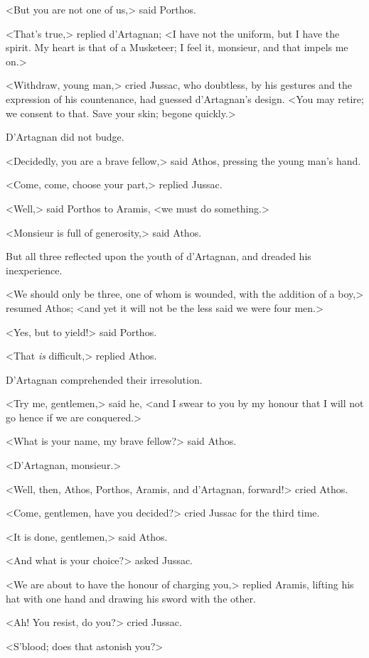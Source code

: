 <But you are not one of us,> said Porthos. 

<That's true,> replied d'Artagnan; <I have not the uniform, but I have the spirit. My heart is that of a Musketeer; I feel it, monsieur, and that impels me on.> 

<Withdraw, young man,> cried Jussac, who doubtless, by his gestures and the expression of his countenance, had guessed d'Artagnan's design. <You may retire; we consent to that. Save your skin; begone quickly.> 

D'Artagnan did not budge. 

<Decidedly, you are a brave fellow,> said Athos, pressing the young man's hand. 

<Come, come, choose your part,> replied Jussac. 

<Well,> said Porthos to Aramis, <we must do something.> 

<Monsieur is full of generosity,> said Athos. 

But all three reflected upon the youth of d'Artagnan, and dreaded his inexperience. 

<We should only be three, one of whom is wounded, with the addition of a boy,> resumed Athos; <and yet it will not be the less said we were four men.> 

<Yes, but to yield!> said Porthos. 

<That \textit{is} difficult,> replied Athos. 

D'Artagnan comprehended their irresolution. 

<Try me, gentlemen,> said he, <and I swear to you by my honour that I will not go hence if we are conquered.> 

<What is your name, my brave fellow?> said Athos. 

<D'Artagnan, monsieur.> 

<Well, then, Athos, Porthos, Aramis, and d'Artagnan, forward!> cried Athos. 

<Come, gentlemen, have you decided?> cried Jussac for the third time. 

<It is done, gentlemen,> said Athos. 

<And what is your choice?> asked Jussac. 

<We are about to have the honour of charging you,> replied Aramis, lifting his hat with one hand and drawing his sword with the other. 

<Ah! You resist, do you?> cried Jussac. 

<S'blood; does that astonish you?> 

